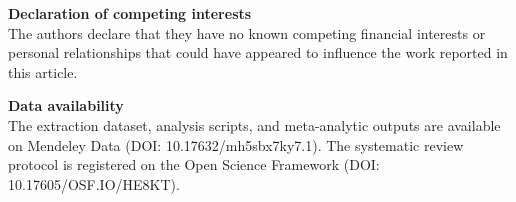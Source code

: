 \documentclass[12pt]{article}
\begin{document}
\vspace{12pt}

\noindent\textbf{Declaration of competing interests}\\[4pt]
The authors declare that they have no known competing financial interests or personal relationships that could have appeared to influence the work reported in this article.

\vspace{12pt}

\noindent\textbf{Data availability}\\[4pt]
The extraction dataset, analysis scripts, and meta-analytic outputs are available on Mendeley Data (DOI: 10.17632/mh5sbx7ky7.1). The systematic review protocol is registered on the Open Science Framework (DOI: 10.17605/OSF.IO/HE8KT).
\end{document}
